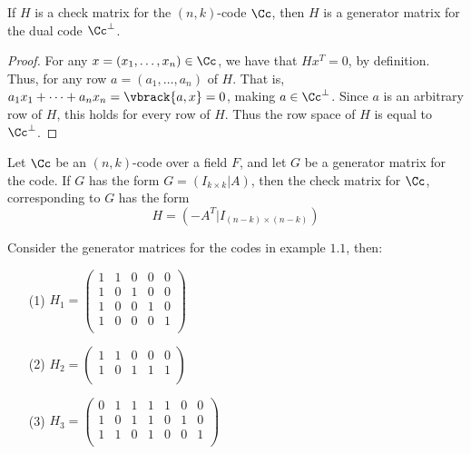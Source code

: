 \begin{lemma}\label{2.1.2}
    If $H$ is a check matrix for the $(n,k)$-code $\Cc$, then $H$ is a generator
    matrix for the dual code  $\Cc^\perp$.
\end{lemma}
\begin{proof}
    For any $x=(x_1, \dots, x_n) \in \Cc$, we have that $Hx^T=0$, by definition.
    Thus, for any row $a=(a_1, \dots, a_n)$ of $H$. That is,
    $a_1x_1+\dots+a_nx_n=\vbrack{a,x}=0$, making $a \in \Cc^\perp$. Since $a$
    is an arbitrary row of $H$, this holds for every row of  $H$. Thus the row
    space of $H$ is equal to $\Cc^\perp$.
\end{proof}

\begin{lemma}\label{2.1.3}
    Let $\Cc$ be an  $(n,k)$-code over a field $F$, and let  $G$ be a generator
    matrix for the code. If  $G$ has the form  $G=(I_{k \times k}|A)$, then the
    check matrix for $\Cc$, corresponding to $G$ has the form
    \begin{equation}
        H=(-A^T|I_{(n-k) \times (n-k)})
    \end{equation}
\end{lemma}

\begin{example}\cite{mceliece}
    Consider the generator matrices for the codes in example $1.1$, then:
    \begin{enumerate}
        \item[(1)] $H_1=\begin{pmatrix}
                    1 & 1 & 0 & 0 & 0 \\
                    1 & 0 & 1 & 0 & 0 \\
                    1 & 0 & 0 & 1 & 0 \\
                    1 & 0 & 0 & 0 & 1 \\
                  \end{pmatrix}$

        \item[(2)] $H_2=\begin{pmatrix}
                    1 & 1 & 0 & 0 & 0 \\
                    1 & 0 & 1 & 1 & 1 \\
                  \end{pmatrix}$

        \item[(3)] $H_3=\begin{pmatrix}
                    0 & 1 & 1 & 1 & 1 & 0 & 0 \\
                    1 & 0 & 1 & 1 & 0 & 1 & 0 \\
                    1 & 1 & 0 & 1 & 0 & 0 & 1 \\
                  \end{pmatrix}$
    \end{enumerate}
\end{example}

